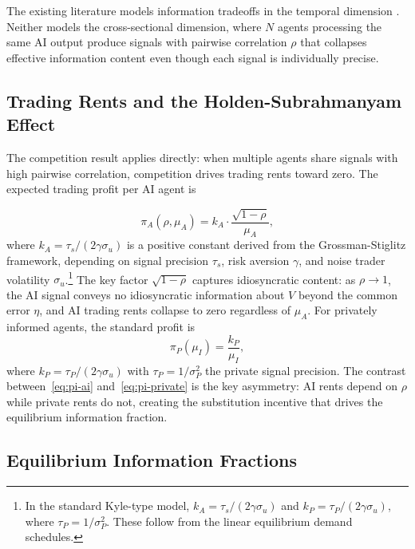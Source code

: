 The existing literature models information tradeoffs in the temporal dimension \citep{dugast2018, farboodi2020}. Neither models the cross-sectional dimension, where $N$ agents processing the same AI output produce signals with pairwise correlation $\rho$ that collapses effective information content even though each signal is individually precise.

\subsection{Trading Rents and the Holden-Subrahmanyam Effect}

The \citet{holden1992} competition result applies directly: when multiple agents share signals with high pairwise correlation, competition drives trading rents toward zero. The expected trading profit per AI agent is

\begin{equation}\label{eq:pi-ai}
  \pi_A(\rho, \mu_A) = k_A \cdot \frac{\sqrt{1-\rho}}{\mu_A},
\end{equation}
where $k_A = \tau_s/(2\gamma\sigma_u)$ is a positive constant derived from the Grossman-Stiglitz framework, depending on signal precision $\tau_s$, risk aversion $\gamma$, and noise trader volatility $\sigma_u$.\footnote{In the standard Kyle-type model, $k_A = \tau_s/(2\gamma\sigma_u)$ and $k_P = \tau_P/(2\gamma\sigma_u)$, where $\tau_P = 1/\sigma_P^2$. These follow from the linear equilibrium demand schedules.} The key factor $\sqrt{1-\rho}$ captures idiosyncratic content: as $\rho \to 1$, the AI signal conveys no idiosyncratic information about $V$ beyond the common error $\eta$, and AI trading rents collapse to zero regardless of $\mu_A$. For privately informed agents, the standard \citet{grossman1980} profit is
\begin{equation}\label{eq:pi-private}
  \pi_P(\mu_I) = \frac{k_P}{\mu_I},
\end{equation}
where $k_P = \tau_P/(2\gamma\sigma_u)$ with $\tau_P = 1/\sigma_P^2$ the private signal precision. The contrast between~\eqref{eq:pi-ai} and~\eqref{eq:pi-private} is the key asymmetry: AI rents depend on $\rho$ while private rents do not, creating the substitution incentive that drives the equilibrium information fraction.

\subsection{Equilibrium Information Fractions}

